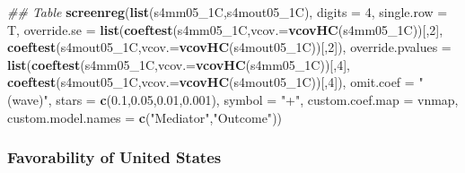 \documentclass[
]{article}
\newenvironment{Shaded}{\begin{snugshade}}{\end{snugshade}}
\newcommand{\CommentTok}[1]{\textcolor[rgb]{0.56,0.35,0.01}{\textit{#1}}}
\newcommand{\DataTypeTok}[1]{\textcolor[rgb]{0.13,0.29,0.53}{#1}}
\newcommand{\DecValTok}[1]{\textcolor[rgb]{0.00,0.00,0.81}{#1}}
\newcommand{\FloatTok}[1]{\textcolor[rgb]{0.00,0.00,0.81}{#1}}
\newcommand{\KeywordTok}[1]{\textcolor[rgb]{0.13,0.29,0.53}{\textbf{#1}}}
\newcommand{\NormalTok}[1]{#1}
\newcommand{\StringTok}[1]{\textcolor[rgb]{0.31,0.60,0.02}{#1}}
\begin{document}
\begin{Shaded}
\begin{Highlighting}[]
\CommentTok{## Table}
\KeywordTok{screenreg}\NormalTok{(}\KeywordTok{list}\NormalTok{(s4mm05_1C,s4mout05_1C), }\DataTypeTok{digits =} \DecValTok{4}\NormalTok{, }\DataTypeTok{single.row =}\NormalTok{ T,}
          \DataTypeTok{override.se =} \KeywordTok{list}\NormalTok{(}\KeywordTok{coeftest}\NormalTok{(s4mm05_1C,}\DataTypeTok{vcov.=}\KeywordTok{vcovHC}\NormalTok{(s4mm05_1C))[,}\DecValTok{2}\NormalTok{],}
                             \KeywordTok{coeftest}\NormalTok{(s4mout05_1C,}\DataTypeTok{vcov.=}\KeywordTok{vcovHC}\NormalTok{(s4mout05_1C))[,}\DecValTok{2}\NormalTok{]),}
          \DataTypeTok{override.pvalues =} \KeywordTok{list}\NormalTok{(}\KeywordTok{coeftest}\NormalTok{(s4mm05_1C,}\DataTypeTok{vcov.=}\KeywordTok{vcovHC}\NormalTok{(s4mm05_1C))[,}\DecValTok{4}\NormalTok{],}
                                  \KeywordTok{coeftest}\NormalTok{(s4mout05_1C,}\DataTypeTok{vcov.=}\KeywordTok{vcovHC}\NormalTok{(s4mout05_1C))[,}\DecValTok{4}\NormalTok{]),}
          \DataTypeTok{omit.coef =} \StringTok{"(wave)"}\NormalTok{, }\DataTypeTok{stars =} \KeywordTok{c}\NormalTok{(}\FloatTok{0.1}\NormalTok{,}\FloatTok{0.05}\NormalTok{,}\FloatTok{0.01}\NormalTok{,}\FloatTok{0.001}\NormalTok{), }\DataTypeTok{symbol =} \StringTok{"+"}\NormalTok{,}
          \DataTypeTok{custom.coef.map =}\NormalTok{ vnmap, }
          \DataTypeTok{custom.model.names =} \KeywordTok{c}\NormalTok{(}\StringTok{"Mediator"}\NormalTok{,}\StringTok{"Outcome"}\NormalTok{))}
\end{Highlighting}
\end{Shaded}

\hypertarget{favorability-of-united-states}{%
\subsubsection{Favorability of United
States}\label{favorability-of-united-states}}
\end{document}
